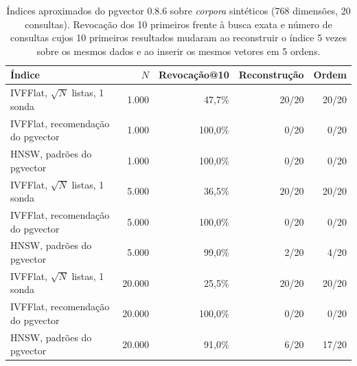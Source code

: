 \begin{table}[htb]
\centering
\caption{Índices aproximados do pgvector 0.8.6 sobre \emph{corpora} sintéticos (768 dimensões, 20 consultas). Revocação dos 10 primeiros frente à busca exata e número de consultas cujos 10 primeiros resultados mudaram ao reconstruir o índice 5 vezes sobre os mesmos dados e ao inserir os mesmos vetores em 5 ordens.}
\label{tab:ann-pgvector}
\small
\begin{tabular}{lrrrr}
\toprule
Índice & $N$ & Revocação@10 & Reconstrução & Ordem \\
\midrule
IVFFlat, $\sqrt{N}$ listas, 1 sonda & 1.000 & 47{,}7\% & 20/20 & 20/20 \\
IVFFlat, recomendação do pgvector & 1.000 & 100{,}0\% & 0/20 & 0/20 \\
HNSW, padrões do pgvector & 1.000 & 100{,}0\% & 0/20 & 0/20 \\
\midrule
IVFFlat, $\sqrt{N}$ listas, 1 sonda & 5.000 & 36{,}5\% & 20/20 & 20/20 \\
IVFFlat, recomendação do pgvector & 5.000 & 100{,}0\% & 0/20 & 0/20 \\
HNSW, padrões do pgvector & 5.000 & 99{,}0\% & 2/20 & 4/20 \\
\midrule
IVFFlat, $\sqrt{N}$ listas, 1 sonda & 20.000 & 25{,}5\% & 20/20 & 20/20 \\
IVFFlat, recomendação do pgvector & 20.000 & 100{,}0\% & 0/20 & 0/20 \\
HNSW, padrões do pgvector & 20.000 & 91{,}0\% & 6/20 & 17/20 \\
\bottomrule
\end{tabular}
\end{table}
